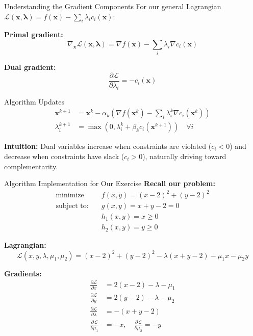 \documentclass[aspectratio=1610]{beamer}
\begin{document}
\begin{frame}{Understanding the Gradient Components}
  For our general Lagrangian $\mathcal{L}(\mathbf{x}, \boldsymbol{\lambda}) = f(\mathbf{x}) - \sum_{i} \lambda_i c_i(\mathbf{x})$:
  
  \vspace{0.3cm}
  \textbf{Primal gradient:}
  $$\nabla_{\mathbf{x}} \mathcal{L}(\mathbf{x}, \boldsymbol{\lambda}) = \nabla f(\mathbf{x}) - \sum_{i} \lambda_i \nabla c_i(\mathbf{x})$$
  
  \textbf{Dual gradient:}
  $$\frac{\partial \mathcal{L}}{\partial \lambda_i} = -c_i(\mathbf{x})$$
  
  \vspace{0.3cm}
  \begin{block}{Algorithm Updates}
    \begin{align}
      \mathbf{x}^{k+1} &= \mathbf{x}^k - \alpha_k \left(\nabla f(\mathbf{x}^k) - \sum_{i} \lambda_i^k \nabla c_i(\mathbf{x}^k)\right)\\
      \lambda_i^{k+1} &= \max(0, \lambda_i^k + \beta_k c_i(\mathbf{x}^{k+1})) \quad \forall i
    \end{align}
  \end{block}
  
  \textbf{Intuition:} Dual variables increase when constraints are violated ($c_i < 0$) and decrease when constraints have slack ($c_i > 0$), naturally driving toward complementarity.
\end{frame}

\begin{frame}{Algorithm Implementation for Our Exercise}
  \textbf{Recall our problem:}
  \begin{align}
    \text{minimize} \quad & f(x,y) = (x-2)^2 + (y-2)^2 \\
    \text{subject to:} \quad & g(x,y) = x + y - 2 = 0 \\
    & h_1(x,y) = x \geq 0 \\
    & h_2(x,y) = y \geq 0
  \end{align}
  
  \textbf{Lagrangian:}
  $$\mathcal{L}(x,y,\lambda,\mu_1,\mu_2) = (x-2)^2 + (y-2)^2 - \lambda(x + y - 2) - \mu_1 x - \mu_2 y$$
  
  \textbf{Gradients:}
  \begin{align}
    \frac{\partial \mathcal{L}}{\partial x} &= 2(x-2) - \lambda - \mu_1\\
    \frac{\partial \mathcal{L}}{\partial y} &= 2(y-2) - \lambda - \mu_2\\
    \frac{\partial \mathcal{L}}{\partial \lambda} &= -(x + y - 2)\\
    \frac{\partial \mathcal{L}}{\partial \mu_1} &= -x, \quad \frac{\partial \mathcal{L}}{\partial \mu_2} = -y
  \end{align}
\end{frame}
\end{document}
